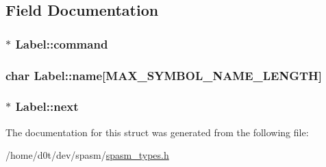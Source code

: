 \subsection{\-Field \-Documentation}
\hypertarget{struct_label_aeaf8698a75695ec399c3ce02c7804fae}{
\subsubsection[{command}]{$\ast$ {\bf \-Label\-::command}}}\label{struct_label_aeaf8698a75695ec399c3ce02c7804fae}
\hypertarget{struct_label_a96e0274a8d36db81d857e9536c8d94e5}{
\subsubsection[{name}]{\setlength{\rightskip}{0pt plus 5cm}char {\bf \-Label\-::name}\mbox{[}{\bf \-M\-A\-X\-\_\-\-S\-Y\-M\-B\-O\-L\-\_\-\-N\-A\-M\-E\-\_\-\-L\-E\-N\-G\-T\-H}\mbox{]}}}\label{struct_label_a96e0274a8d36db81d857e9536c8d94e5}
\hypertarget{struct_label_aba70a946336559c889fe6a5a3e43f785}{
\subsubsection[{next}]{$\ast$ {\bf \-Label\-::next}}}\label{struct_label_aba70a946336559c889fe6a5a3e43f785}


\-The documentation for this struct was generated from the following file\-:\begin{DoxyCompactItemize}
\item 
/home/d0t/dev/spasm/\hyperlink{spasm__types_8h}{spasm\-\_\-types.\-h}\end{DoxyCompactItemize}
